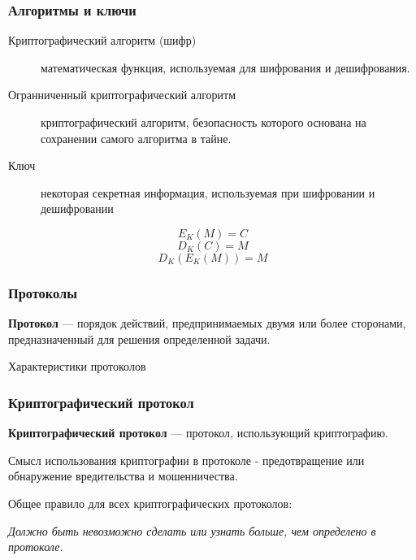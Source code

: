 \documentclass{beamer}
\newcommand{\define}[2]{{\bf #1} --- #2.\vspace{1em}}
\begin{document}
\begin{frame}
  \frametitle{Алгоритмы и ключи}

  \begin{description}
  \item [Криптографический алгоритм (шифр)] математическая функция, используемая для шифрования и дешифрования.
  \item [Огранниченный криптографический алгоритм] криптографический алгоритм, безопасность которого основана на сохранении самого алгоритма в тайне.
  \item [Ключ] некоторая секретная информация, используемая при шифровании и дешифровании
  \end{description}
  

  \[E_{K}(M)=C\]
  \[D_{K}(C)=M\]
  \[D_{K}(E_{K}(M))=M\]

\end{frame}


\begin{frame}[shrink]
  \frametitle{Протоколы}

  \define{Протокол} {порядок действий, предпринимаемых двумя или более сторонами, предназначенный для решения определенной задачи}

\begin{block}{Характеристики протоколов}
\end{block}

\end{frame}

\begin{frame}
  \frametitle{Криптографический протокол}

  \define{Криптографический протокол} {протокол, использующий криптографию}

  Смысл использования криптографии в протоколе - предотвращение или обнаружение вредительства и мошенничества.

  \vspace{1\baselineskip}
  Общее правило для всех криптографических протоколов:
  \vspace{0.5em}
  
  \textit{Должно быть невозможно сделать или узнать больше, чем определено в протоколе.}

\end{frame}
\end{document}
